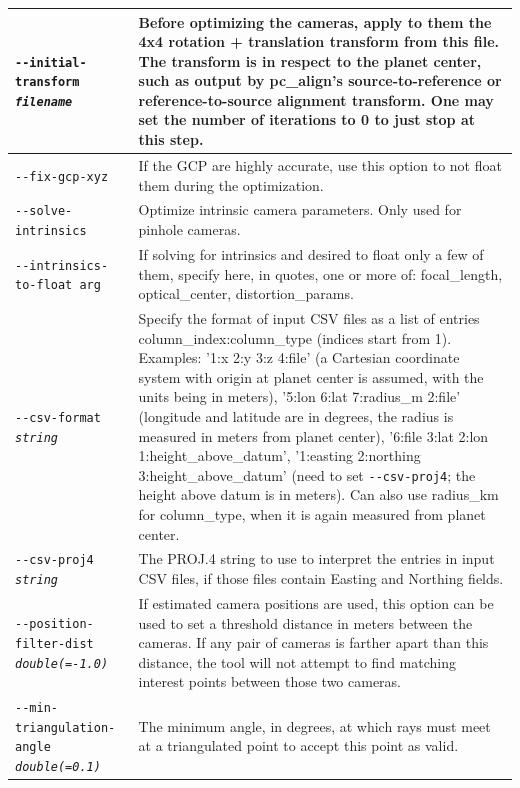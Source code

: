 \begin{longtable}{|l|p{7.5cm}|}
\texttt{-\/-initial-transform \textit{filename}} & Before optimizing the cameras, apply to them the 4x4 rotation + translation transform from this file. The transform is in respect to the planet center, such as output by pc\_align's source-to-reference or reference-to-source alignment transform. One may set the number of iterations to 0 to just stop at this step. \\ \hline

\texttt{-\/-fix-gcp-xyz} & If the GCP are highly accurate, use this option to not float them during the optimization.\\ \hline

\texttt{-\/-solve-intrinsics} & Optimize intrinsic camera parameters. Only used for pinhole cameras.\\ \hline

\texttt{-\/-intrinsics-to-float arg} & If solving for intrinsics and desired to float only a few of them, specify here, in quotes, one or more of: focal\_length, optical\_center, distortion\_params.\\ \hline

\texttt{-\/-csv-format \textit{string}} & Specify the format of input
CSV files as a list of entries column\_index:column\_type (indices start
from 1). Examples: '1:x 2:y 3:z 4:file' (a Cartesian coordinate system with
origin at planet center is assumed, with the units being in meters),
'5:lon 6:lat 7:radius\_m 2:file' (longitude and latitude are in degrees, the
radius is measured in meters from planet center), '6:file 3:lat 2:lon
1:height\_above\_datum', '1:easting 2:northing 3:height\_above\_datum'
(need to set \texttt{-\/-csv-proj4}; the height above datum is in
meters). Can also use radius\_km for column\_type, when it is again
measured from planet center.\\ \hline

\texttt{-\/-csv-proj4 \textit{string}} & The PROJ.4 string to use to
interpret the entries in input CSV files, if those files contain Easting
and Northing fields. \\ \hline

\texttt{-\/-position-filter-dist \textit{double(=-1.0)}} &
If estimated camera positions are used, this option can be used to set a threshold distance in meters
between the cameras.  If any pair of cameras is farther apart than this distance, the tool will not
attempt to find matching interest points between those two cameras.
\\ \hline

\texttt{-\/-min-triangulation-angle \textit{double(=0.1)}} &
The minimum angle, in degrees, at which rays must meet at a triangulated point to accept this point as valid.
\\ \hline


\end{longtable}
